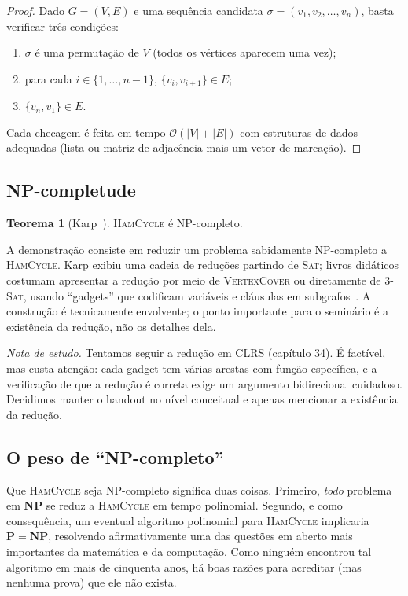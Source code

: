 \documentclass[11pt,a4paper]{article}
\theoremstyle{definition}
\newtheorem{teo}{Teorema}[section]
\newcommand{\nota}[1]{%
  \par\medskip
  {\small\color{notagray}\textit{Nota de estudo.} #1}\par\medskip
}
\begin{document}
\begin{proof}
Dado $G = (V, E)$ e uma sequência candidata $\sigma = (v_1, v_2, \ldots, v_n)$, basta verificar três condições:
\begin{enumerate}[label=(\roman*),leftmargin=*]
  \item $\sigma$ é uma permutação de $V$ (todos os vértices aparecem uma vez);
  \item para cada $i \in \{1, \ldots, n-1\}$, $\{v_i, v_{i+1}\} \in E$;
  \item $\{v_n, v_1\} \in E$.
\end{enumerate}
Cada checagem é feita em tempo $\mathcal{O}(|V| + |E|)$ com estruturas de dados adequadas (lista ou matriz de adjacência mais um vetor de marcação).
\end{proof}

\subsection{NP-completude}

\begin{teo}[Karp~\citep{karp1972}]
\textsc{HamCycle} é NP-completo.
\end{teo}

A demonstração consiste em reduzir um problema sabidamente NP-completo a \textsc{HamCycle}. Karp exibiu uma cadeia de reduções partindo de \textsc{Sat}; livros didáticos costumam apresentar a redução por meio de \textsc{VertexCover} ou diretamente de 3-\textsc{Sat}, usando ``gadgets'' que codificam variáveis e cláusulas em subgrafos~\citep{cormen2012,sipser2005,dasgupta2009}. A construção é tecnicamente envolvente; o ponto importante para o seminário é a existência da redução, não os detalhes dela.

\nota{Tentamos seguir a redução em CLRS (capítulo 34). É factível, mas custa atenção: cada gadget tem várias arestas com função específica, e a verificação de que a redução é correta exige um argumento bidirecional cuidadoso. Decidimos manter o handout no nível conceitual e apenas mencionar a existência da redução.}

\subsection{O peso de ``NP-completo''}

Que \textsc{HamCycle} seja NP-completo significa duas coisas. Primeiro, \emph{todo} problema em \textbf{NP} se reduz a \textsc{HamCycle} em tempo polinomial. Segundo, e como consequência, um eventual algoritmo polinomial para \textsc{HamCycle} implicaria $\mathbf{P} = \mathbf{NP}$, resolvendo afirmativamente uma das questões em aberto mais importantes da matemática e da computação. Como ninguém encontrou tal algoritmo em mais de cinquenta anos, há boas razões para acreditar (mas nenhuma prova) que ele não exista.
\end{document}
